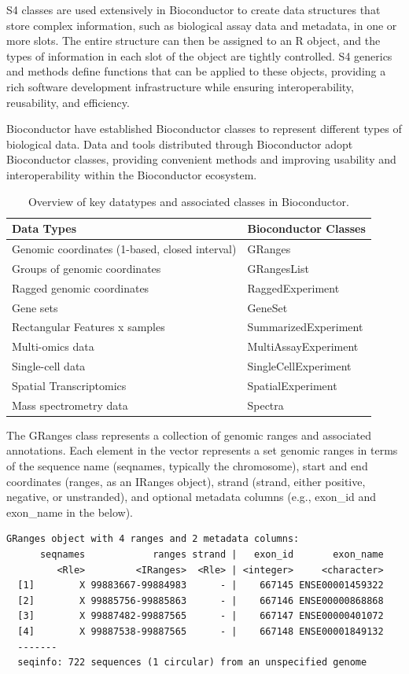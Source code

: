 S4 classes are used extensively in Bioconductor to create data structures that store complex information, such as biological assay data and metadata, in one or more slots. The entire structure can then be assigned to an R object, and the types of information in each slot of the object are tightly controlled. S4 generics and methods define functions that can be applied to these objects, providing a rich software development infrastructure while ensuring interoperability, reusability, and efficiency.

Bioconductor have established Bioconductor classes to represent different types of biological data. Data and tools distributed through Bioconductor adopt Bioconductor classes, providing convenient methods and improving usability and interoperability within the Bioconductor ecosystem.

\begin{table}
\caption{Overview of key datatypes and associated classes in Bioconductor.}
\begin{tabular}[t]{ll}
\toprule
Data Types & Bioconductor Classes\\
\midrule
Genomic coordinates (1-based, closed interval) & GRanges\\
Groups of genomic coordinates & GRangesList\\
Ragged genomic coordinates & RaggedExperiment\\
Gene sets & GeneSet\\
Rectangular Features x samples & SummarizedExperiment\\
\addlinespace
Multi-omics data & MultiAssayExperiment\\
Single-cell data & SingleCellExperiment\\
Spatial Transcriptomics & SpatialExperiment\\
Mass spectrometry data & Spectra\\
\bottomrule
\end{tabular}
\end{table}

The GRanges class represents a collection of genomic ranges and associated annotations. Each element in the vector represents a set genomic ranges in terms of the sequence name (seqnames, typically the chromosome), start and end coordinates (ranges, as an IRanges object), strand (strand, either positive, negative, or unstranded), and optional metadata columns (e.g., exon\_id and exon\_name in the below).

\begin{verbatim}
GRanges object with 4 ranges and 2 metadata columns:
      seqnames            ranges strand |   exon_id       exon_name
         <Rle>         <IRanges>  <Rle> | <integer>     <character>
  [1]        X 99883667-99884983      - |    667145 ENSE00001459322
  [2]        X 99885756-99885863      - |    667146 ENSE00000868868
  [3]        X 99887482-99887565      - |    667147 ENSE00000401072
  [4]        X 99887538-99887565      - |    667148 ENSE00001849132
  -------
  seqinfo: 722 sequences (1 circular) from an unspecified genome
\end{verbatim}

